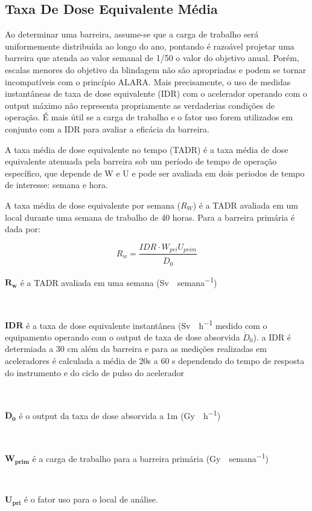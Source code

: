 \documentclass[11pt,a4paper]{article}
\newcounter{exemplo}
\begin{document}
    \subsection{Taxa De Dose Equivalente Média}

        Ao determinar uma barreira, assume-se que a carga de trabalho será uniformemente distribuída ao longo do ano, pontando é razoável projetar uma barreira que atenda ao valor semanal de 1/50 o valor do objetivo anual. Porém, escalas menores do objetivo da blindagem não são apropriadas e podem se tornar incompatíveis com o princípio ALARA. Mais precisamente, o uso de medidas instantâneas de taxa de dose equivalente (IDR) com o acelerador operando com o output máximo não representa propriamente as verdaderias condições de operação. É mais útil se a carga de trabalho e o fator uso forem utilizados em conjunto com a IDR para avaliar a eficácia da barreira. 

        A taxa média de dose equivalente no tempo (TADR) é a taxa média de dose equivalente atenuada pela barreira sob um período de tempo de operação específico, que depende de W e U e pode ser avaliada em dois periodos de tempo de interesse: semana e hora.

        A taxa média de dose equivalente por semana (${R_W}$) é a TADR avaliada em  um local  durante uma semana de trabalho de 40 horas. Para a barreira primária é dada por:

        \begin{equation}
            R_w = \frac{IDR \cdot W_{pri} U_{prim}}{\dot{D}_0}
        \end{equation}

        \begin{exemplo}[onde:]
            \textcolor{CarnationPink}{$\mathbf{R_w}$} é a TADR avaliada em uma semana (\unit{Sv \cdot semana^{-1}})

            \

            \textcolor{CarnationPink}{$\mathbf{IDR}$} é a taxa de dose equivalente instantânea (\unit{Sv \cdot h^{-1}} medido com o equipamento operando com o output de taxa de dose absorvida $\dot{D}_0$). a IDR é determiada a 30 cm além da barreira e para as medições realizadas em aceleradores é calculada a média de 20s a 60 s dependendo do tempo de resposta do instrumento e do ciclo de pulso do acelerador

            \

            \textcolor{CarnationPink}{$\mathbf{\dot{D}_0}$} é o output da taxa de dose absorvida a 1m (\unit{Gy \cdot h^{-1}})

            \

            \textcolor{CarnationPink}{$\mathbf{W_{prim}}$} é a carga de trabalho para a barreira primária (\unit{Gy \cdot semana^{-1}})

            \

            \textcolor{CarnationPink}{$\mathbf{U_{pri}}$} é o fator uso para o local de análise.
        \end{exemplo}
\end{document}
